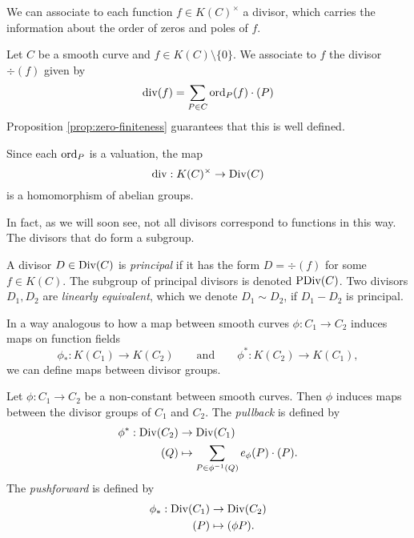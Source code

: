 We can associate to each function $f \in K(C)^\times$ a divisor, which carries
the information about the order of zeros and poles of $f$.

\begin{definition}
	Let $C$ be a smooth curve and $f \in K(C)\setminus\{0\}$. We
	associate to $f$ the divisor $\div(f)$ given by
	\begin{equation*}
		\operatorname{div}(f) = \sum_{P \in C}\operatorname{ord}_P(f)\cdot(P)
	\end{equation*}
	Proposition \ref{prop:zero-finiteness} guarantees that this is well
	defined.
\end{definition}

\begin{remark}
	Since each $\operatorname{ord}_P$ is a valuation, the map
	\begin{equation*}
		\operatorname{div}: K(C)^\times \to \operatorname{Div}(C)
	\end{equation*}
	is a homomorphism of abelian groups.
\end{remark}

In fact, as we will soon see, not all divisors correspond to functions
in this way. The divisors that do form a subgroup.

\begin{definition}
	A divisor $D \in \operatorname{Div}(C)$ is \emph{principal} if it has the form
	$D = \div(f)$ for some $f \in K(C)$. The subgroup of principal divisors
	is denoted $\operatorname{PDiv}(C)$.
	Two divisors $D_1, D_2$ are \emph{linearly equivalent}, which we denote
	$D_1 \sim D_2$, if $D_1 - D_2$ is principal.
\end{definition}


In a way analogous to how a map between smooth curves $\phi: C_1 \to C_2$
induces maps on function fields
\begin{equation*}
	\phi_*: K(C_1) \to K(C_2)
	\qquad\textrm{and}\qquad
	\phi^*: K(C_2) \to K(C_1),
\end{equation*}
we can define maps between divisor groups.

\begin{definition}
	Let $\phi: C_1 \to C_2$ be a non-constant between smooth curves.
	Then $\phi$ induces maps between the divisor groups of $C_1$ and $C_2$.
	The \emph{pullback} is defined by
	\begin{align*}
		\phi^*: \operatorname{Div}(C_2) &\to \operatorname{Div}(C_1)\\
		(Q) &\mapsto \sum_{P \in \phi^{-1}(Q)}e_\phi(P)\cdot(P).
	\end{align*}
	The \emph{pushforward} is defined by
	\begin{align*}
		\phi_*: \operatorname{Div}(C_1) &\to \operatorname{Div}(C_2)\\
		(P) &\mapsto (\phi P).
	\end{align*}
\end{definition}

